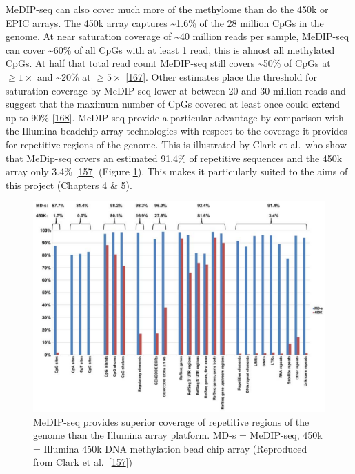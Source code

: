 \documentclass[
]{book}
\begin{document}
MeDIP-seq can also cover much more of the methylome than do the 450k or EPIC arrays.
The 450k array captures \textasciitilde1.6\% of the 28 million CpGs in the genome.
At near saturation coverage of \textasciitilde40 million reads per sample, MeDIP-seq can cover \textasciitilde60\% of all CpGs with at least 1 read, this is almost all methylated CpGs.
At half that total read count MeDIP-seq still covers \textasciitilde50\% of CpGs at \(\ge1\times\) and \textasciitilde20\% at \(\ge5\times\) {[}\protect\hyperlink{ref-Taiwo2012}{167}{]}.
Other estimates place the threshold for saturation coverage by MeDIP-seq lower at between 20 and 30 million reads and suggest that the maximum number of CpGs covered at least once could extend up to 90\% {[}\protect\hyperlink{ref-Chavez2010}{168}{]}.
MeDIP-seq provide a particular advantage by comparison with the Illumina beadchip array technologies with respect to the coverage it provides for repetitive regions of the genome.
This is illustrated by Clark et al.~who show that MeDip-seq covers an estimated 91.4\% of repetitive sequences and the 450k array only 3.4\% {[}\protect\hyperlink{ref-Clark2012}{157}{]} (Figure \ref{fig:Clark2012fig1}).
This makes it particularly suited to the aims of this project (Chapters \protect\hyperlink{tRNAs}{4} \& \protect\hyperlink{Alus}{5}).

\begin{figure}

{\centering \includegraphics[width=0.9\linewidth]{figs/Clark2012fig1MeDIPseqVs450Kcoverage} 

}

\caption{MeDIP-seq provides superior coverage of repetitive regions of the genome than the Illumina array platform. MD-s = MeDIP-seq, 450k = Illumina 450k DNA methylation bead chip array (Reproduced from Clark et al.~{[}\protect\hyperlink{ref-Clark2012}{157}{]})}\label{fig:Clark2012fig1}
\end{figure}
\end{document}
